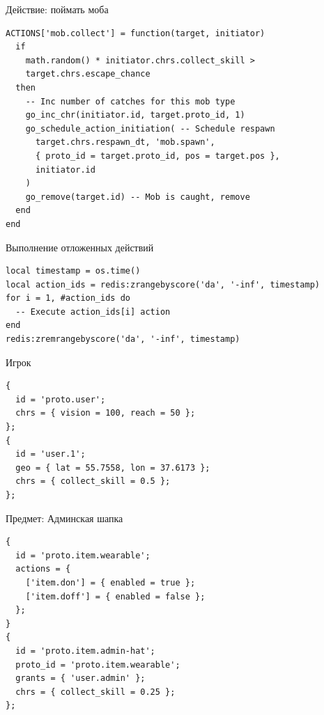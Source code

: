 \documentclass[aspectratio=169,handout,bigger]{beamer}
\begin{document}

\begin{frame}[fragile]{Действие: поймать моба}
\begin{verbatim}
ACTIONS['mob.collect'] = function(target, initiator)
  if
    math.random() * initiator.chrs.collect_skill >
    target.chrs.escape_chance
  then
    -- Inc number of catches for this mob type
    go_inc_chr(initiator.id, target.proto_id, 1)
    go_schedule_action_initiation( -- Schedule respawn
      target.chrs.respawn_dt, 'mob.spawn',
      { proto_id = target.proto_id, pos = target.pos },
      initiator.id
    )
    go_remove(target.id) -- Mob is caught, remove
  end
end
\end{verbatim}
\end{frame}


\begin{frame}[fragile]{Выполнение отложенных действий}
\begin{verbatim}
local timestamp = os.time()
local action_ids = redis:zrangebyscore('da', '-inf', timestamp)
for i = 1, #action_ids do
  -- Execute action_ids[i] action
end
redis:zremrangebyscore('da', '-inf', timestamp)
\end{verbatim}
\end{frame}


\begin{frame}[fragile]{Игрок}
\begin{verbatim}
{
  id = 'proto.user';
  chrs = { vision = 100, reach = 50 };
};
{
  id = 'user.1';
  geo = { lat = 55.7558, lon = 37.6173 };
  chrs = { collect_skill = 0.5 };
};
\end{verbatim}
\end{frame}


\begin{frame}[fragile]{Предмет: Админская шапка}
\begin{verbatim}
{
  id = 'proto.item.wearable';
  actions = {
    ['item.don'] = { enabled = true };
    ['item.doff'] = { enabled = false };
  };
}
{
  id = 'proto.item.admin-hat';
  proto_id = 'proto.item.wearable';
  grants = { 'user.admin' };
  chrs = { collect_skill = 0.25 };
};
\end{verbatim}
\end{frame}
\end{document}
